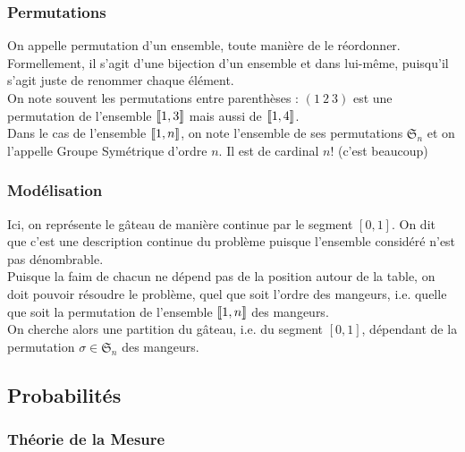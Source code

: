\documentclass{beamercours}
\begin{document}
\begin{frame}
    \frametitle{Permutations}
     {On appelle permutation d'un ensemble, toute manière de le réordonner.\\}
     {Formellement, il s'agit d'une bijection d'un ensemble et dans lui-même, puisqu'il s'agit juste de renommer chaque élément.\\}
     {On note souvent les permutations entre parenthèses : $\left(1 \ 2 \ 3\right)$ est une permutation de l'ensemble $\left\llbracket 1, 3\right\rrbracket$ mais aussi de $\left\llbracket 1, 4\right\rrbracket$.\\}
     {Dans le cas de l'ensemble $\left\llbracket 1, n\right\rrbracket$, on note l'ensemble de ses permutations $\mathfrak{S}_{n}$ et on l'appelle Groupe Symétrique d'ordre $n$. Il est de cardinal $n!$ (c'est beaucoup)}
\end{frame}

\begin{frame}
    \frametitle{Modélisation}
     {Ici, on représente le gâteau de manière continue par le segment $\left[0, 1\right]$. On dit que c'est une description continue du problème puisque l'ensemble considéré n'est pas dénombrable.\\}
     {Puisque la faim de chacun ne dépend pas de la position autour de la table, on doit pouvoir résoudre le problème, quel que soit l'ordre des mangeurs, i.e. quelle que soit la permutation de l'ensemble $\left\llbracket 1, n\right\rrbracket$ des mangeurs. \\}
     {On cherche alors une partition du gâteau, i.e. du segment $\left[0, 1\right]$, dépendant de la permutation $\sigma \in \mathfrak{S}_{n}$ des mangeurs.}
\end{frame}

\subsection{Probabilités}
\begin{frame}
    \frametitle{Théorie de la Mesure}
\end{frame}
\end{document}
